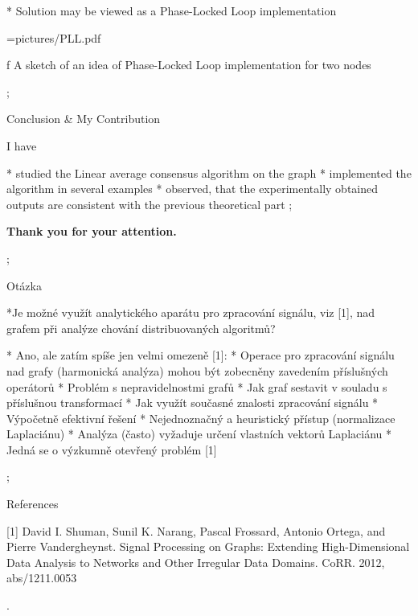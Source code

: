 * Solution may be viewed as a Phase-Locked Loop implementation

\centerline{\picw=\hsize \inspic pictures/PLL.pdf } 
\caption/f A sketch of an idea of Phase-Locked Loop implementation for two nodes

\pg;








\sec Conclusion \& My Contribution

I have 

* studied the Linear average consensus algorithm on the graph 
* implemented the  algorithm in  several examples
* observed, that the experimentally obtained outputs are consistent with the previous theoretical part
\pg;

\null
\vskip2cm
\centerline{\typosize[35/40]\bf Thank you for your attention.}\pg;



\sec  Otázka

*Je možné využít analytického aparátu pro zpracování signálu, viz [1],  \nl   nad grafem při
analýze chování distribuovaných algoritmů?

* Ano, ale zatím spíše jen velmi omezeně [1]: 
\begitems
* Operace pro zpracování signálu nad grafy (harmonická analýza) mohou být zobecněny zavedením příslušných operátorů
* Problém s nepravidelnostmi grafů
\begitems
* Jak graf sestavit v souladu s příslušnou transformací
* Jak využít současné znalosti zpracování signálu
* Výpočetně efektivní řešení 
\enditems
* Nejednoznačný a heuristický přístup (normalizace Laplaciánu)
* Analýza (často) vyžaduje určení vlastních vektorů Laplaciánu
\enditems
* Jedná se o výzkumně otevřený problém [1]

\pg;

\sec References

 [1] David I. Shuman, Sunil K. Narang, Pascal Frossard, Antonio Ortega, and Pierre
Vandergheynst. Signal Processing on Graphs: Extending High-Dimensional
Data Analysis to Networks and Other Irregular Data Domains. CoRR. 2012,
abs/1211.0053 


\pg. %

